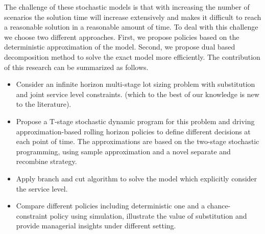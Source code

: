 \documentclass[10pt]{article}
\begin{document}
The challenge of these stochastic models is that with increasing the number of scenarios the solution time will increase extensively and makes it difficult to reach a reasonable solution in a reasonable amount of time. To deal with this challenge we choose two different approaches. First, we propose policies based on the deterministic approximation of the model. Second, we propose dual based decomposition method to solve the exact model more efficiently. 
The contribution of this research can be summarized as follows. 
\begin{itemize}
\item Consider an infinite horizon multi-stage lot sizing problem with substitution and joint service level constraints. (which to the best of our knowledge is new to the literature).

\item Propose a T-stage stochastic dynamic program for this problem and driving approximation-based rolling horizon policies to define different decisions at each point of time. The approximations are based on the two-stage stochastic programming, using sample approximation and a novel separate and recombine strategy. 

\item Apply branch and cut algorithm to solve the model which explicitly consider the service level.

\item Compare different policies including deterministic one and a chance-constraint policy using simulation, illustrate the value of substitution and provide managerial insights under different setting.%
    


\end{itemize}
\end{document}
